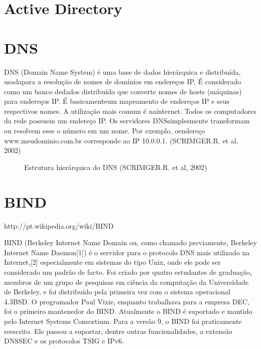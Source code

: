 \section{Active Directory}

\section{DNS}

DNS (Domain Name System) é uma base de dados hierárquica e distribuída, usadapara a resolução de nomes de domínios em endereços IP. É considerado como um banco dedados distribuído que converte nomes de hosts (máquinas) para endereços IP. É basicamenteum mapeamento de endereços IP e seus respectivos nomes. A utilização mais comum é nainternet. Todos os computadores da rede possuem um endereço IP. Os servidores DNSsimplesmente transformam ou resolvem esse o número em um nome. Por exemplo, oendereço www.meudominio.com.br corresponde ao IP 10.0.0.1. (SCRIMGER.R. et al, 2002)

\begin{figure}[ht]
   	\centering
   	\caption{Estrutura hierárquica do DNS (SCRIMGER.R. et al, 2002)}
    \label{dns}
\end{figure}


\section{BIND}

http://pt.wikipedia.org/wiki/BIND

BIND (Berkeley Internet Name Domain ou, como chamado previamente, Berkeley Internet Name Daemon[1]) é o servidor para o protocolo DNS mais utilizado na Internet,[2] especialmente em sistemas do tipo Unix, onde ele pode ser considerado um padrão de facto. Foi criado por quatro estudantes de graduação, membros de um grupo de pesquisas em ciência da computação da Universidade de Berkeley, e foi distribuído pela primeira vez com o sistema operacional 4.3BSD. O programador Paul Vixie, enquanto trabalhava para a empresa DEC, foi o primeiro mantenedor do BIND. Atualmente o BIND é suportado e mantido pelo Internet Systems Consortium.
Para a versão 9, o BIND foi praticamente reescrito. Ele passou a suportar, dentre outras funcionalidades, a extensão DNSSEC e os protocolos TSIG e IPv6.

